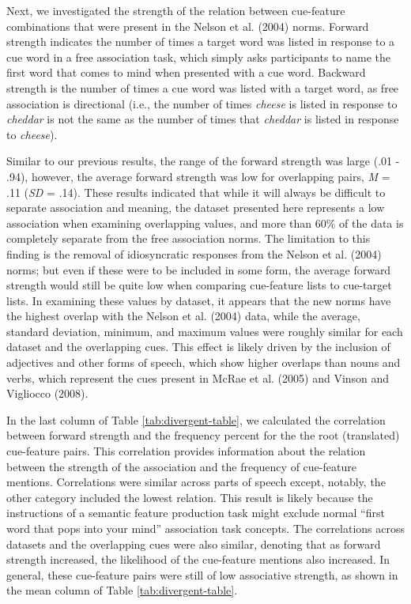 \documentclass[english,,man]{apa6}
\begin{document}
Next, we investigated the strength of the relation between cue-feature combinations that were present in the Nelson et al. (2004) norms. Forward strength indicates the number of times a target word was listed in response to a cue word in a free association task, which simply asks participants to name the first word that comes to mind when presented with a cue word. Backward strength is the number of times a cue word was listed with a target word, as free association is directional (i.e., the number of times \emph{cheese} is listed in response to \emph{cheddar} is not the same as the number of times that \emph{cheddar} is listed in response to \emph{cheese}).

Similar to our previous results, the range of the forward strength was large (.01 - .94), however, the average forward strength was low for overlapping pairs, \emph{M} = .11 (\emph{SD} = .14). These results indicated that while it will always be difficult to separate association and meaning, the dataset presented here represents a low association when examining overlapping values, and more than 60\% of the data is completely separate from the free association norms. The limitation to this finding is the removal of idiosyncratic responses from the Nelson et al. (2004) norms; but even if these were to be included in some form, the average forward strength would still be quite low when comparing cue-feature lists to cue-target lists. In examining these values by dataset, it appears that the new norms have the highest overlap with the Nelson et al. (2004) data, while the average, standard deviation, minimum, and maximum values were roughly similar for each dataset and the overlapping cues. This effect is likely driven by the inclusion of adjectives and other forms of speech, which show higher overlaps than nouns and verbs, which represent the cues present in McRae et al. (2005) and Vinson and Vigliocco (2008).

In the last column of Table \ref{tab:divergent-table}, we calculated the correlation between forward strength and the frequency percent for the the root (translated) cue-feature pairs. This correlation provides information about the relation between the strength of the association and the frequency of cue-feature mentions. Correlations were similar across parts of speech except, notably, the other category included the lowest relation. This result is likely because the instructions of a semantic feature production task might exclude normal \enquote{first word that pops into your mind} association task concepts. The correlations across datasets and the overlapping cues were also similar, denoting that as forward strength increased, the likelihood of the cue-feature mentions also increased. In general, these cue-feature pairs were still of low associative strength, as shown in the mean column of Table \ref{tab:divergent-table}.
\end{document}
